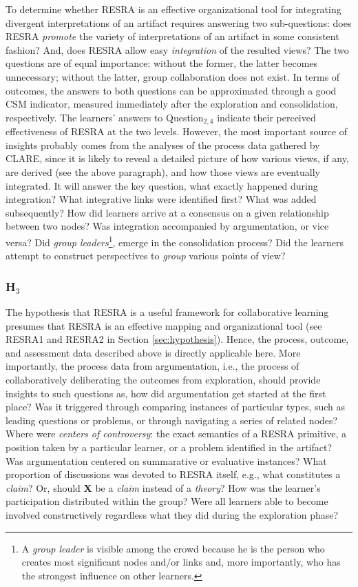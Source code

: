 To determine whether RESRA is an effective organizational tool for
integrating divergent interpretations of an artifact requires answering two
sub-questions: does RESRA {\it promote\/} the variety of interpretations of
an artifact in some consistent fashion? And, does RESRA allow easy {\it
integration\/} of the resulted views?  The two questions are of equal
importance: without the former, the latter becomes unnecessary; without the
latter, group collaboration does not exist. In terms of outcomes, the
answers to both questions can be approximated through a good CSM indicator,
measured immediately after the exploration and consolidation, respectively.
The learners' answers to Question\(_{2,4}\) indicate their perceived
effectiveness of RESRA at the two levels.  However, the most important
source of insights probably comes from the analyses of the process data
gathered by CLARE, since it is likely to reveal a detailed picture of how
various views, if any, are derived (see the above paragraph), and how those
views are eventually integrated.  It will answer the key question, what
exactly happened during integration?  What integrative links were
identified first? What was added subsequently?  How did learners arrive at
a consensus on a given relationship between two nodes? Was integration
accompanied by argumentation, or vice versa?  Did {\it group
leaders\/}\footnote{A {\it group leader\/} is visible among the crowd
because he is the person who creates most significant nodes and/or links
and, more importantly, who has the strongest influence on other learners.},
emerge in the consolidation process? Did the learners attempt to construct
perspectives to {\it group\/} various points of view?


\subsubsection{H\(_3\)}
\label{sec:resra3 data}

The hypothesis that RESRA is a useful framework for collaborative learning
presumes that RESRA is an effective mapping and organizational tool (see
{\sf RESRA1\/} and {\sf RESRA2\/} in Section \ref{sec:hypothesis}). Hence,
the process, outcome, and assessment data described above is directly
applicable here. More importantly, the process data from argumentation,
i.e., the process of collaboratively deliberating the outcomes from
exploration, should provide insights to such questions as, how did
argumentation get started at the first place?  Was it triggered through
comparing instances of particular types, such as leading questions or
problems, or through navigating a series of related nodes? Where were
{\it centers of controversy\/}: the exact semantics of a RESRA primitive, a
position taken by a particular learner, or a problem identified in the
artifact? Was argumentation centered on summarative or evaluative
instances?  What proportion of discussions was devoted to RESRA itself,
e.g., what constitutes a {\it claim\/}? Or, should {\bf X} be a {\it
claim\/} instead of a {\it theory\/}?  How was the learner's participation
distributed within the group? Were all learners able to become involved
constructively regardless what they did during the exploration phase?


